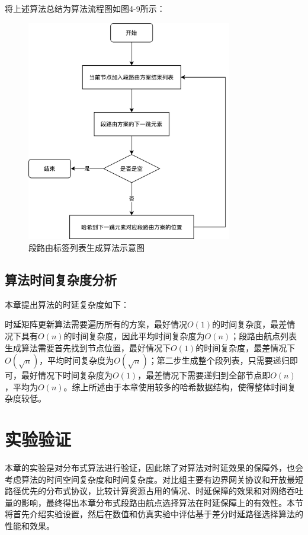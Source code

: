 将上述算法总结为算法流程图如图4-9所示：

\begin{figure}[htbp]
\setlength{\abovecaptionskip}{15pt plus 3pt minus 2pt}
\centerline{\includegraphics[width=0.8\textwidth]{./figures/ch4-sr-init.png}}
\caption{段路由标签列表生成算法示意图}
\label{fig-ch4-sr-init}
\end{figure}

\subsection{算法时间复杂度分析}

本章提出算法的时延复杂度如下：

时延矩阵更新算法需要遍历所有的方案，最好情况$O\left(1\right)$的时间复杂度，最差情况下具有$O\left(n\right)$的时间复杂度，因此平均时间复杂度为$O\left(n\right)$；段路由航点列表生成算法需要首先找到节点位置，最好情况下$O\left(1\right)$的时间复杂度，最差情况下$O\left(\sqrt n\right)$，平均时间复杂度为$O\left(\sqrt n\right)$；第二步生成整个段列表，只需要递归即可，最好情况下时间复杂度为$O\left(1\right)$，最差情况下需要递归到全部节点即$O\left(n\right)$，平均为$O\left(n\right)$。综上所述由于本章使用较多的哈希数据结构，使得整体时间复杂度较低。

\section{实验验证}

本章的实验是对分布式算法进行验证，因此除了对算法对时延效果的保障外，也会考虑算法的时间空间复杂度和时间复杂度。对比组主要有边界网关协议和开放最短路径优先的分布式协议，比较计算资源占用的情况、时延保障的效果和对网络吞吐量的影响，最终得出本章分布式段路由航点选择算法在时延保障上的有效性。本节将首先介绍实验设置，然后在数值和仿真实验中评估基于差分时延路径选择算法的性能和效果。

